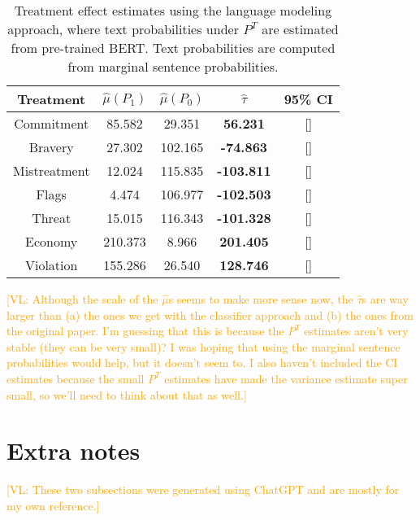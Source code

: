 \documentclass{article}
\newcommand{\vl}[1]{\textcolor{orange}{[VL: #1]}}
\begin{document}
\begin{table}[!ht]
    \centering
    \begin{tabular}{c|cccc}
        \toprule
        Treatment & $\hat{\mu}(P_1)$ & $\hat{\mu}(P_0)$ & $\hat{\tau}$ & 95\% CI \\
        \midrule
        Commitment & 85.582 & 29.351 & \textcolor{green!50!black}{\textbf{56.231}} & [] \\
        Bravery & 27.302 & 102.165 & \textcolor{red!80!black}{\textbf{-74.863}} & [] \\
        Mistreatment & 12.024 & 115.835 & \textcolor{red!80!black}{\textbf{-103.811}} & [] \\
        Flags & 4.474 & 106.977 & \textcolor{red!80!black}{\textbf{-102.503}} & [] \\
        Threat & 15.015 & 116.343 & \textcolor{red!80!black}{\textbf{-101.328}} & [] \\
        Economy & 210.373 & 8.966 & \textcolor{green!50!black}{\textbf{201.405}} & [] \\
        Violation & 155.286 & 26.540 & \textcolor{green!50!black}{\textbf{128.746}} & [] \\
        \bottomrule
    \end{tabular}
    \caption{Treatment effect estimates using the language modeling approach, where text probabilities under $P^T$ are estimated from pre-trained BERT. Text probabilities are computed from marginal sentence probabilities.}
    \label{tab:results_lm2}
\end{table}

\vl{Although the scale of the $\hat{\mu}$s seems to make more sense now, the $\hat{\tau}$s are way larger than (a) the ones we get with the classifier approach and (b) the ones from the original paper. I'm guessing that this is because the $P^T$ estimates aren't very stable (they can be very small)? I was hoping that using the marginal sentence probabilities would help, but it doesn't seem to.
\newline
\newline
I also haven't included the CI estimates because the small $P^T$ estimates have made the variance estimate super small, so we'll need to think about that as well.}

\section{Extra notes}

\vl{These two subsections were generated using ChatGPT and are mostly for my own reference.}
\end{document}
